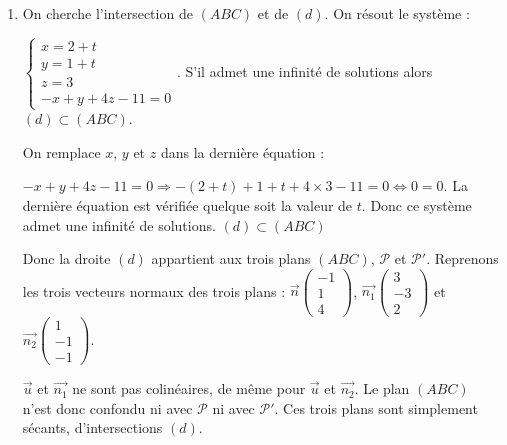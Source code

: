 \documentclass[10pt]{article}
\providecommand{\R}{\mathbb{R}}
\providecommand{\vect}[1]{\overrightarrow{#1}}
\begin{document}
\begin{enumerate}[resume]
La droite $(d)$ passe donc par $M$ et a pour vecteur directeur $(d)~:~\vect{u}$ donc 

$\begin{cases} x=2+t\\y=1+t\\z=3\end{cases},~t\in \R$

	\item On cherche l'intersection de $(ABC)$ et de $(d)$. On résout le système : 

$\begin{cases} x=2+t\\y=1+t\\z=3\\-x+y+4z-11=0\end{cases}$. S'il admet une infinité de solutions alors $(d)\subset (ABC)$.

	On remplace $x$, $y$ et $z$ dans la dernière équation : 

	$-x+y+4z-11=0 \Rightarrow -(2+t)+1+t+4\times 3-11=0 \iff 0=0$. La dernière équation est vérifiée quelque soit la valeur de $t$. Donc ce système admet une infinité de solutions. $(d)\subset (ABC)$

	Donc la droite $(d)$ appartient aux trois plans $(ABC)$, $\mathcal{P}$ et $\mathcal{P}'$.
	Reprenons les trois vecteurs normaux des trois plans : $\vect{n}\begin{pmatrix}-1\\1\\4\end{pmatrix}$, $\vect{n_1}\begin{pmatrix}3\\-3\\2\end{pmatrix}$ et $\vect{n_2}\begin{pmatrix}1\\-1\\-1\end{pmatrix}$.
	
	$\vect{u}$ et $\vect{n_1}$ ne sont pas colinéaires, de même pour $\vect{u}$ et $\vect{n_2}$. Le plan $(ABC)$ n'est donc  confondu ni avec $\mathcal{P}$  ni avec $\mathcal{P}'$. Ces trois plans sont simplement sécants, d'intersections $(d)$.
\end{enumerate}
\end{document}
